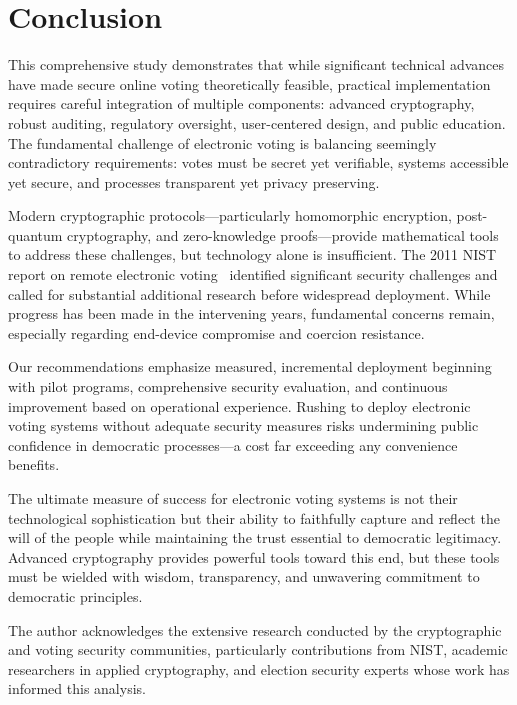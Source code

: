 \documentclass[sigconf,nonacm]{acmart}
\begin{document}
\section{Conclusion}

This comprehensive study demonstrates that while significant technical advances have made
secure online voting theoretically feasible, practical implementation requires careful
integration of multiple components: advanced cryptography, robust auditing, regulatory
oversight, user-centered design, and public education. The fundamental challenge of
electronic voting is balancing seemingly contradictory requirements: votes must be secret
yet verifiable, systems accessible yet secure, and processes transparent yet privacy
preserving.

\sloppy Modern cryptographic protocols---particularly homomorphic encryption, post-quantum
cryptography, and zero-knowledge proofs---provide mathematical tools to address these
challenges, but technology alone is insufficient. The 2011 NIST report on remote
electronic voting~\cite{hastings2011nistir} identified significant security challenges
and called for substantial additional research before widespread deployment. While
progress has been made in the intervening years, fundamental concerns remain, especially
regarding end-device compromise and coercion resistance.

Our recommendations emphasize measured, incremental deployment beginning with pilot
programs, comprehensive security evaluation, and continuous improvement based on
operational experience. Rushing to deploy electronic voting systems without adequate
security measures risks undermining public confidence in democratic processes---a cost
far exceeding any convenience benefits.

\fussy
The ultimate measure of success for electronic voting systems is not their technological
sophistication but their ability to faithfully capture and reflect the will of the people
while maintaining the trust essential to democratic legitimacy. Advanced cryptography
provides powerful tools toward this end, but these tools must be wielded with wisdom,
transparency, and unwavering commitment to democratic principles.

\begin{acks}
The author acknowledges the extensive research conducted by the cryptographic and
voting security communities, particularly contributions from NIST, academic researchers
in applied cryptography, and election security experts whose work has informed this
analysis.
\end{acks}
\end{document}
